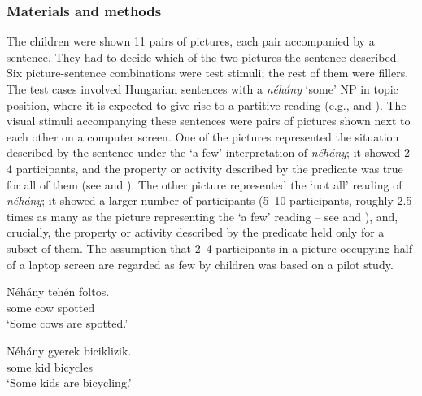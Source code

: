 \documentclass[output=paper]{langscibook}
\begin{document}
\subsubsection{Materials and methods}

The children were shown 11 pairs of pictures, each pair accompanied by a sentence. They had to decide which of the two pictures the sentence described. Six picture-sentence combinations were test stimuli; the rest of them were fillers. The test cases involved Hungarian sentences with a \textit{néhány} `some' NP in topic position, where it is expected to give rise to a partitive reading (e.g.,  and ). The visual stimuli accompanying these sentences were pairs of pictures shown next to each other on a computer screen. One of the pictures represented the situation described by the sentence under the `a few' interpretation of \textit{néhány}; it showed 2--4 participants, and the property or activity described by the predicate was true for all of them (see  and ). The other picture represented the `not all' reading of \textit{néhány}; it showed a larger number of participants (5--10 participants, roughly 2.5 times as many as the picture representing the `a few' reading – see  and ), and, crucially, the property or activity described by the predicate held only for a subset of them. The assumption that 2--4 participants in a picture occupying half of a laptop screen are regarded as few by children was based on a pilot study. 

\begin{multicols}{2}

\ea
\gll \label{kis-zet:nehany tehen}Néhány tehén foltos. \\
some cow spotted \\
\glt `Some cows are spotted.'
\z

\columnbreak

\ea
\gll \label{kis-zet:nehany gyerek}Néhány gyerek biciklizik.\\  
     some kid bicycles\\ 
\glt `Some kids are bicycling.'
\z

\end{multicols}
\end{document}
